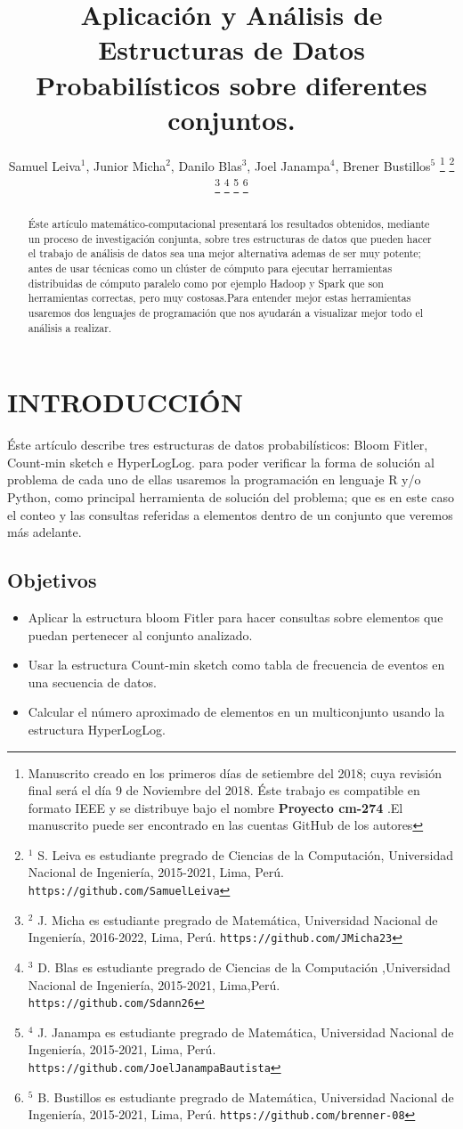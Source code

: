 \documentclass[journal]{IEEEtran}
\title{\LARGE \bf Aplicaci\'on y Análisis de Estructuras de Datos Probabil\'isticos sobre diferentes conjuntos. 
}
\author{Samuel Leiva$^{1}$, Junior Micha$^{2}$, Danilo Blas$^{3}$, Joel Janampa$^{4}$, Brener Bustillos$^{5}$%
\thanks{Manuscrito creado en los primeros d\'ias de setiembre del 2018; cuya revisi\'on final ser\'a el d\'ia 9 de Noviembre del 2018. \'Este trabajo es compatible en formato IEEE y se distribuye bajo el nombre \textbf{Proyecto cm-274} .El manuscrito puede ser encontrado en las cuentas GitHub de los autores}%
\thanks{$^{1}$ S. Leiva es estudiante pregrado de Ciencias de la Computaci\'on, Universidad Nacional de Ingenier\'ia, 2015-2021, Lima, Per\'u.
        {\tt\small https://github.com/SamuelLeiva}}%
\thanks{$^{2}$ J. Micha es estudiante pregrado de Matem\'atica, Universidad Nacional de Ingenier\'ia, 2016-2022, Lima, Per\'u.
        {\tt\small https://github.com/JMicha23}}%
\thanks{$^{3}$ D. Blas es estudiante pregrado de Ciencias de la Computaci\'on ,Universidad Nacional de Ingenier\'ia, 2015-2021, Lima,Per\'u.
        {\tt\small https://github.com/Sdann26}}%
\thanks{$^{4}$ J. Janampa es estudiante pregrado de Matem\'atica, Universidad Nacional de Ingenier\'ia, 2015-2021, Lima, Per\'u.
        {\tt\small https://github.com/JoelJanampaBautista}}%
\thanks{$^{5}$ B. Bustillos es estudiante pregrado de Matem\'atica, Universidad Nacional de Ingenier\'ia, 2015-2021, Lima, Per\'u. 
        {\tt\small https://github.com/brenner-08}}%
}
\begin{document}
\maketitle
\thispagestyle{empty}
\pagestyle{empty}


\begin{abstract}
   
\'Este art\'iculo matem\'atico-computacional presentar\'a los resultados obtenidos, mediante un proceso de investigaci\'on conjunta, sobre tres estructuras de datos que pueden hacer el trabajo de an\'alisis de datos sea una mejor alternativa ademas de ser muy potente; antes de usar t\'ecnicas como un cl\'uster de c\'omputo para ejecutar herramientas distribuidas de c\'omputo paralelo como por ejemplo  Hadoop y Spark que son herramientas correctas, pero muy costosas.Para entender mejor estas herramientas usaremos dos lenguajes de programaci\'on que nos ayudar\'an a visualizar mejor todo el an\'alisis a realizar. 

\end{abstract}


\section{INTRODUCCI\'ON}

\'Este art\'iculo describe tres estructuras de datos probabil\'isticos: Bloom Fitler, Count-min sketch e HyperLogLog. para poder verificar la forma de soluci\'on al problema de cada uno de ellas usaremos la programaci\'on en lenguaje R y/o Python, como principal herramienta de soluci\'on del problema; que es en este caso el conteo y las consultas referidas a elementos dentro de un conjunto que veremos m\'as adelante.

\subsection{Objetivos}

\begin{itemize}
    \item Aplicar la estructura bloom Fitler para hacer consultas sobre elementos que puedan pertenecer al conjunto analizado. 
    \item Usar la estructura Count-min sketch como tabla de frecuencia de eventos en una secuencia de datos.
    \item Calcular el número aproximado de elementos en un multiconjunto usando la estructura HyperLogLog.\\ 
\end{itemize}
\end{document}

